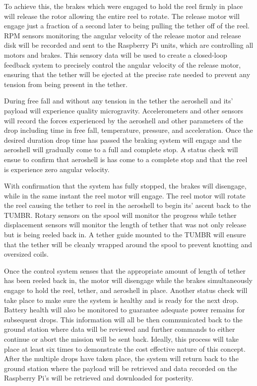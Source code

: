 To achieve this, the brakes which were engaged to hold the reel firmly in place will release the rotor allowing the entire reel to rotate. The release motor will engage just a fraction of a second later to being pulling the tether off of the reel. RPM sensors monitoring the angular velocity of the release motor and release disk will be recorded and sent to the Raspberry Pi units, which are controlling all motors and brakes. This sensory data will be used to create a closed-loop feedback system to precisely control the angular velocity of the release motor, ensuring that the tether will be ejected at the precise rate needed to prevent any tension from being present in the tether. 

During free fall and without any tension in the tether the aeroshell and its' payload will experience quality microgravity. Accelerometers and other sensors will record the forces experienced by the aeroshell and other parameters of the drop including time in free fall, temperature, pressure, and acceleration. Once the desired duration drop time has passed the braking system will engage and the aeroshell will gradually come to a full and complete stop. A status check will ensue to confirm that aeroshell is has come to a complete stop and that the reel is experience zero angular velocity. 

With confirmation that the system has fully stopped, the brakes will disengage, while in the same instant the reel motor will engage. The reel motor will rotate the reel causing the tether to reel in the aeroshell to begin its' ascent back to the TUMBR. Rotary sensors on the spool will monitor the progress while tether displacement sensors will monitor the length of tether that was not only release but is being reeled back in. A tether guide mounted to the TUMBR will ensure that the tether will be cleanly wrapped around the spool to prevent knotting and oversized coils. 

Once the control system senses that the appropriate amount of length of tether has been reeled back in, the motor will disengage while the brakes simultaneously engage to hold the reel, tether, and aeroshell in place. Another status check will take place to make sure the system is healthy and is ready for the next drop. Battery health will also be monitored to guarantee adequate power remains for subsequent drops. This information will all be then communicated back to the ground station where data will be reviewed and further commands to either continue or abort the mission will be sent back. Ideally, this process will take place at least six times to demonstrate the cost effective nature of this concept. After the multiple drops have taken place, the system will return back to the ground station where the payload will be retrieved and data recorded on the Raspberry Pi's will be retrieved and downloaded for posterity.

